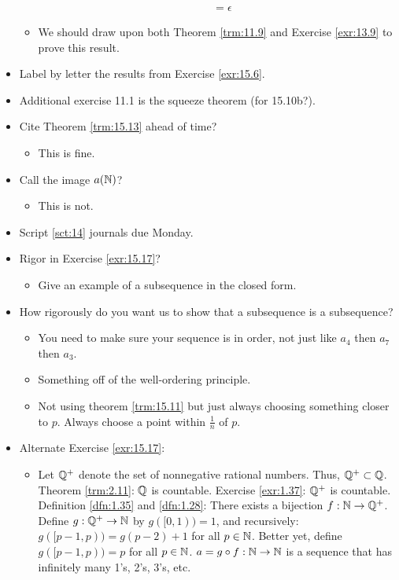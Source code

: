 \documentclass{report}
\begin{document}
\begin{itemize}
\begin{itemize}
\begin{align*}
            &= \epsilon
        \end{align*}
        \item We should draw upon both Theorem \ref{trm:11.9} and Exercise \ref{exr:13.9} to prove this result.
    \end{itemize}
    \item {}Label by letter the results from Exercise \ref{exr:15.6}.
    \item Additional exercise 11.1 is the squeeze theorem (for 15.10b?).
    \item Cite Theorem \ref{trm:15.13} ahead of time?
    \begin{itemize}
        \item This is fine.
    \end{itemize}
    \item Call the image $a(\mathbb{N})$?
    \begin{itemize}
        \item This is not.
    \end{itemize}
    \item Script \ref{sct:14} journals due Monday.
    \item {}Rigor in Exercise \ref{exr:15.17}?
    \begin{itemize}
        \item Give an example of a subsequence in the closed form.
    \end{itemize}
    \item How rigorously do you want us to show that a subsequence is a subsequence?
    \begin{itemize}
        \item You need to make sure your sequence is in order, not just like $a_4$ then $a_7$ then $a_3$.
        \item Something off of the well-ordering principle.
        \item Not using theorem \ref{trm:15.11} but just always choosing something closer to $p$. Always choose a point within $\frac{1}{n}$ of $p$.
    \end{itemize}
    \item Alternate Exercise \ref{exr:15.17}:
    \begin{itemize}
        \item Let $\mathbb{Q}^+$ denote the set of nonnegative rational numbers. Thus, $\mathbb{Q}^+\subset\mathbb{Q}$. Theorem \ref{trm:2.11}: $\mathbb{Q}$ is countable. Exercise \ref{exr:1.37}: $\mathbb{Q}^+$ is countable. Definition \ref{dfn:1.35} and \ref{dfn:1.28}: There exists a bijection $f:\mathbb{N}\to\mathbb{Q}^+$. Define $g:\mathbb{Q}^+\to\mathbb{N}$ by $g([0,1))=1$, and recursively: $g([p-1,p))=g(p-2)+1$ for all $p\in\mathbb{N}$. Better yet, define $g([p-1,p))=p$ for all $p\in\mathbb{N}$. $a=g\circ f:\mathbb{N}\to\mathbb{N}$ is a sequence that has infinitely many 1's, 2's, 3's, etc.
    \end{itemize}
\end{itemize}
\end{document}
